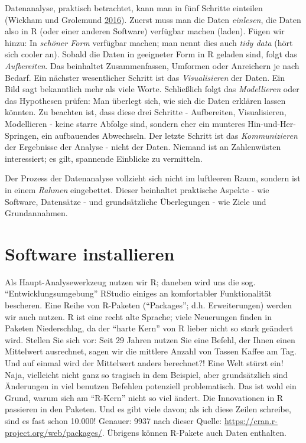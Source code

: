 \documentclass[12pt,ngerman,]{book}
\theoremstyle{definition}
\theoremstyle{definition}
\theoremstyle{remark}
\begin{document}
Datenanalyse, praktisch betrachtet, kann man in fünf Schritte einteilen
(Wickham und Grolemund \protect\hyperlink{ref-r4ds}{2016}). Zuerst muss
man die Daten \emph{einlesen}, die Daten also in R (oder einer anderen
Software) verfügbar machen (laden). Fügen wir hinzu: In \emph{schöner
Form} verfügbar machen; man nennt dies auch \emph{tidy data} (hört sich
cooler an). Sobald die Daten in geeigneter Form in R geladen sind, folgt
das \emph{Aufbereiten}. Das beinhaltet Zusammenfassen, Umformen oder
Anreichern je nach Bedarf. Ein nächster wesentlicher Schritt ist das
\emph{Visualisieren} der Daten. Ein Bild sagt bekanntlich mehr als viele
Worte. Schließlich folgt das \emph{Modellieren} oder das Hypothesen
prüfen: Man überlegt sich, wie sich die Daten erklären lassen könnten.
Zu beachten ist, dass diese drei Schritte - Aufbereiten, Visualisieren,
Modellieren - keine starre Abfolge sind, sondern eher ein munteres
Hin-und-Her-Springen, ein aufbauendes Abwechseln. Der letzte Schritt ist
das \emph{Kommunizieren} der Ergebnisse der Analyse - nicht der Daten.
Niemand ist an Zahlenwüsten interessiert; es gilt, spannende Einblicke
zu vermitteln.

Der Prozess der Datenanalyse vollzieht sich nicht im luftleeren Raum,
sondern ist in einem \emph{Rahmen} eingebettet. Dieser beinhaltet
praktische Aspekte - wie Software, Datensätze - und grundsätzliche
Überlegungen - wie Ziele und Grundannahmen.

\section{Software installieren}\label{software-installieren}

Als Haupt-Analysewerkzeug nutzen wir R; daneben wird uns die sog.
``Entwicklungsumgebung'' RStudio einiges an komfortabler Funktionalität
bescheren. Eine Reihe von R-Paketen (``Packages''; d.h. Erweiterungen)
werden wir auch nutzen. R ist eine recht alte Sprache; viele Neuerungen
finden in Paketen Niederschlag, da der ``harte Kern'' von R lieber nicht
so stark geändert wird. Stellen Sie sich vor: Seit 29 Jahren nutzen Sie
eine Befehl, der Ihnen einen Mittelwert ausrechnet, sagen wir die
mittlere Anzahl von Tassen Kaffee am Tag. Und auf einmal wird der
Mittelwert anders berechnet?! Eine Welt stürzt ein! Naja, vielleicht
nicht ganz so tragisch in dem Beispiel, aber grundsätzlich sind
Änderungen in viel benutzen Befehlen potenziell problematisch. Das ist
wohl ein Grund, warum sich am ``R-Kern'' nicht so viel ändert. Die
Innovationen in R passieren in den Paketen. Und es gibt viele davon; als
ich diese Zeilen schreibe, sind es fast schon 10.000! Genauer: 9937 nach
dieser Quelle: \url{https://cran.r-project.org/web/packages/}. Übrigens
können R-Pakete auch Daten enthalten.
\end{document}
